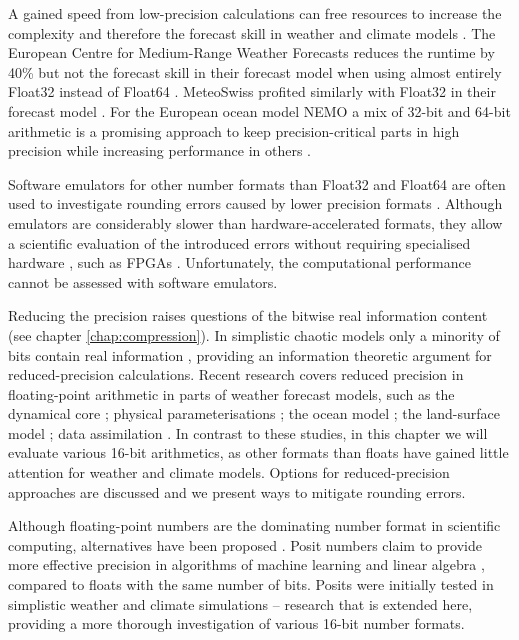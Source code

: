 A gained speed from low-precision calculations can free resources to increase the complexity and therefore the forecast skill in
weather and climate models \citep{Bauer2020}. The European Centre for Medium-Range Weather Forecasts reduces the runtime by
40\% but not the forecast skill in their forecast model when using almost entirely Float32 instead of Float64 \citep{Vana2017}. MeteoSwiss
profited similarly with Float32 in their forecast model \citep{Rudisuhli2013,Fuhrer2018}. For the European ocean model NEMO
\citep{Madec2017} a mix of 32-bit and 64-bit arithmetic is a promising approach to keep precision-critical parts in high precision while
increasing performance in others \citep{TintoPrims2019}.

Software emulators for other number formats than Float32 and Float64 are often used to investigate rounding errors caused by lower
precision formats \citep{Dawson2017}. Although emulators are considerably slower than hardware-accelerated formats, they allow a
scientific evaluation of the introduced errors without requiring specialised hardware \citep{Johnson2020}, such as FPGAs
\citep{Russell2017}. Unfortunately, the computational performance cannot be assessed with software emulators.

Reducing the precision raises questions of the bitwise real information content (see chapter \ref{chap:compression}). In simplistic chaotic
models only a minority of bits contain real information \citep{Jeffress2017}, providing an information theoretic argument for reduced-precision
calculations. Recent research covers reduced precision in floating-point arithmetic in parts of weather forecast models,
such as the dynamical core \citep{Duben2014,Thornes2017,Chantry2019,Hatfield2020}; physical parameterisations \citep{Saffin2020};
the ocean model \citep{TintoPrims2019}; the land-surface model \citep{Dawson2018}; data assimilation \citep{Hatfield2017,Hatfield2018}.
In contrast to these studies, in this chapter we will evaluate various 16-bit arithmetics, as other formats than floats have gained little
attention for weather and climate models. Options for reduced-precision approaches are discussed and we present ways to mitigate rounding errors.

Although floating-point numbers are the dominating number format in scientific computing, alternatives have been proposed
\citep{Gustafson2017a}. Posit numbers claim to provide more effective precision in algorithms of machine learning
and linear algebra \citep{Gustafson2017a,Langroudi2019,Chen2018}, compared to floats with the same number of bits.
Posits were initially tested in simplistic weather and climate simulations \citep{Klower2019a} -- research that is extended
here, providing a more thorough investigation of various 16-bit number formats.


